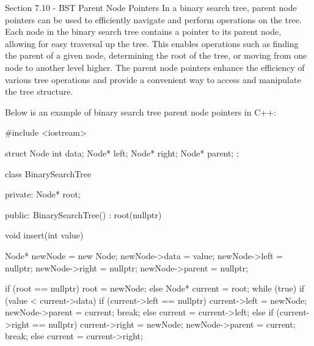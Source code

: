 \begin{notes}{Section 7.10 - BST Parent Node Pointers}
    In a binary search tree, parent node pointers can be used to efficiently navigate and perform operations on the tree. Each node in the binary search tree contains a pointer to its parent node, allowing for easy traversal up the tree. This enables operations such as finding the parent of a given node, determining the root of the tree, 
    or moving from one node to another level higher. The parent node pointers enhance the efficiency of various tree operations and provide a convenient way to access and manipulate the tree structure.
    
    \begin{highlight}
        Below is an example of binary search tree parent node pointers in C++:
    
    \begin{code}[C++]
    #include <iostream>

    struct Node {
        int data;
        Node* left;
        Node* right;
        Node* parent;
    };
    
    class BinarySearchTree {
    private:
        Node* root;
    
    public:
        BinarySearchTree() : root(nullptr) {}
    
        void insert(int value) {
            Node* newNode = new Node;
            newNode->data = value;
            newNode->left = nullptr;
            newNode->right = nullptr;
            newNode->parent = nullptr;
    
            if (root == nullptr) {
                root = newNode;
            } else {
                Node* current = root;
                while (true) {
                    if (value < current->data) {
                        if (current->left == nullptr) {
                            current->left = newNode;
                            newNode->parent = current;
                            break;
                        } else {
                            current = current->left;
                        }
                    } else {
                        if (current->right == nullptr) {
                            current->right = newNode;
                            newNode->parent = current;
                            break;
                        } else {
                            current = current->right;
                        }
                    }
                }
            }
        }
    
}
\end{code}
\end{highlight}
\end{notes}
